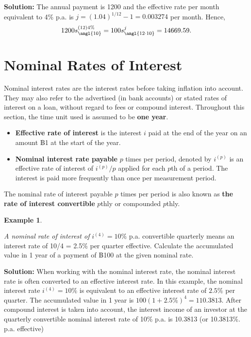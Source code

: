 \documentclass[
]{book}
\theoremstyle{definition}
\theoremstyle{definition}
\newtheorem{example}{Example}[chapter]
\theoremstyle{definition}
\theoremstyle{definition}
\theoremstyle{remark}
\begin{document}
\textbf{Solution:} The annual payment is 1200 and the effective rate per
month equivalent to 4\% p.a. is \(j = (1.04)^{1/12} - 1 = 0.003274\) per
month. Hence,
\[1200 s^{(12)4\%}_\angl{10}   = 100  s^j_\angl{12\cdot 10} = 14669.59.\]

\hypertarget{nominal-rates-of-interest}{%
\section{Nominal Rates of Interest}\label{nominal-rates-of-interest}}

Nominal interest rates are the interest rates before taking inflation
into account. They may also refer to the advertised (in bank accounts)
or stated rates of interest on a loan, without regard to fees or
compound interest. Throughout this section, the time unit used is
assumed to be \textbf{one year}.

\begin{itemize}
\item
  \textbf{Effective rate of interest} is the interest \(i\) paid at the end
  of the year on an amount ฿1 at the start of the year.
\item
  \textbf{Nominal interest rate payable} \(p\) times per period, denoted by
  \(i^{(p)}\) is an effective rate of interest of \(i^{(p)}/p\) applied
  for each \(p\)th of a period. The interest is paid more frequently
  than once per measurement period.
\end{itemize}

The nominal rate of interest payable \(p\) times per period is also known
as \textbf{the rate of interest convertible} \(p\)thly or compounded \(p\)thly.

\begin{example}
\protect\hypertarget{exm:unlabeled-div-38}{}\label{exm:unlabeled-div-38}

\emph{A nominal rate of interest of} \(i^{(4)} = 10\%\) p.a. convertible
quarterly means an interest rate of 10/4 = 2.5\% per quarter effective.
Calculate the accumulated value in 1 year of a payment of ฿100 at the
given nominal rate.

\end{example}

\textbf{Solution:} When working with the nominal interest rate, the nominal
interest rate is often converted to an effective interest rate. In this
example, the nominal interest rate \(i^{(4)} = 10\%\) is equivalent to an
effective interest rate of \(2.5\%\) per quarter. The accumulated value in
1 year is \(100 (1 + 2.5\%)^4 = 110.3813\). After compound interest is
taken into account, the interest income of an investor at the quarterly
convertible nominal interest rate of 10\% p.a. is 10.3813 (or 10.3813\%.
p.a. effective)
\end{document}
